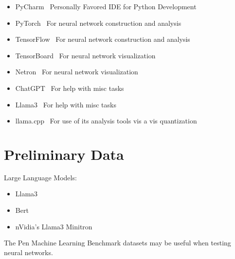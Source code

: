 \documentclass{article}
\begin{document}
\begin{itemize}
    \item PyCharm~\cite{pycharm_2024}
    \subitem Personally Favored IDE for Python Development
    \item PyTorch~\cite{pytorch_2024}
    \subitem For neural network construction and analysis
    \item TensorFlow~\cite{tensorflow_2024}
    \subitem For neural network construction and analysis
    \item TensorBoard~\cite{tensorboard_2024}
    \subitem For neural network visualization
    \item Netron~\cite{netron_2024}
    \subitem For neural network visualization
    \item ChatGPT~\cite{chatgpt_2024}
    \subitem For help with misc tasks
    \item Llama3~\cite{meta_llama_3_8B_2024}
    \subitem For help with misc tasks
    \item llama.cpp~\cite{gerganov_llama_cpp}
    \subitem For use of its analysis tools vis a vis quantization
\end{itemize}

\section*{Preliminary Data}
Large Language Models:

\begin{itemize}
    \item Llama3~\cite{meta_llama_3_8B_2024}
    \item Bert~\cite{bert_base_cased_2024}
    \item nVidia's Llama3 Minitron~\cite{llama_3_1_minitron_2024}
\end{itemize}

The Pen Machine Learning Benchmark datasets may be useful when testing neural networks\cite{Olson2017PMLB}.
\end{document}
